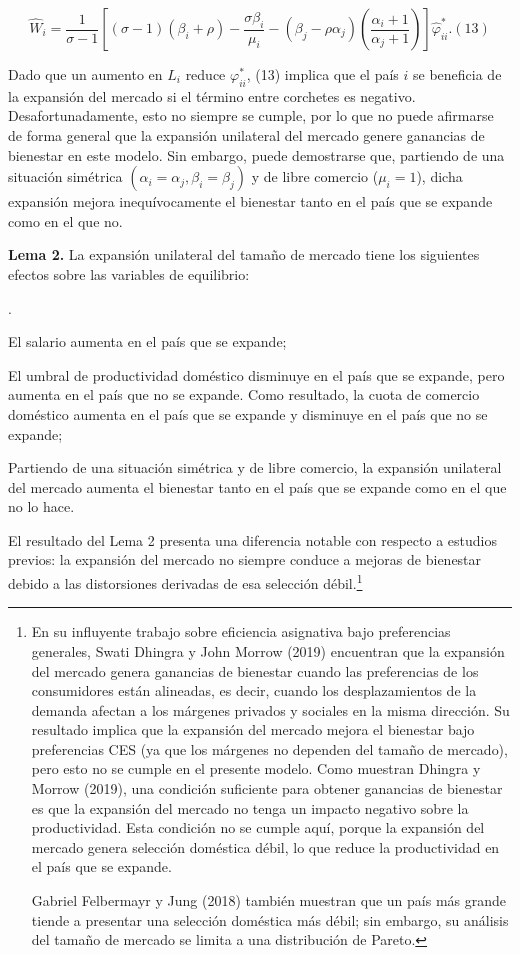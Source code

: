 \documentclass[10pt,a4paper]{article}
\newcounter{numitem}
\newenvironment{lnum}
      {\begin{list}{\arabic{numitem}.}{%
          \usecounter{numitem}%
          \setlength{\leftmargin}{1cm}%
          \setlength{\parskip}{3pt}%
          \setlength{\itemsep}{0pt}%
          \setlength{\parsep}{0pt}%
      }}
      {\end{list}}
\begin{document}
$$\hat{W}_i =\frac{1}{\sigma - 1}\left[(\sigma - 1)(\beta_i + \rho) -\frac{\sigma\beta_i}{\mu_i}-(\beta_j-\rho\alpha_j)\left(\frac{\alpha_i+1}{\alpha_j+1}\right)\right]\hat{\varphi}_{ii}^*.(13)$$

Dado que un aumento en $L_i$ reduce $\varphi_{ii}^*$, (13) implica que el país $i$ se beneficia de la expansión del mercado si el término entre corchetes es negativo. Desafortunadamente, esto no siempre se cumple, por lo que no puede afirmarse de forma general que la expansión unilateral del mercado genere ganancias de bienestar en este modelo. Sin embargo, puede demostrarse que, partiendo de una situación simétrica $(\alpha_i = \alpha_j, \beta_i = \beta_j)$ y de libre comercio ($\mu_i = 1$), dicha expansión mejora inequívocamente el bienestar tanto en el país que se expande como en el que no.

\textbf{Lema 2.} La expansión unilateral del tamaño de mercado tiene los siguientes efectos sobre las variables de equilibrio:
\begin{lnum}
    \item El salario aumenta en el país que se expande;
    \item El umbral de productividad doméstico disminuye en el país que se expande, pero aumenta en el país que no se expande. Como resultado, la cuota de comercio doméstico aumenta en el país que se expande y disminuye en el país que no se expande;
    \item Partiendo de una situación simétrica y de libre comercio, la expansión unilateral del mercado aumenta el bienestar tanto en el país que se expande como en el que no lo hace.
\end{lnum}

El resultado del Lema 2 presenta una diferencia notable con respecto a estudios previos: la expansión del mercado no siempre conduce a mejoras de bienestar debido a las distorsiones derivadas de esa selección débil.\footnote{%
    En su influyente trabajo sobre eficiencia asignativa bajo preferencias generales, Swati Dhingra y John Morrow (2019) encuentran que la expansión del mercado genera ganancias de bienestar cuando las preferencias de los consumidores están alineadas, es decir, cuando los desplazamientos de la demanda afectan a los márgenes privados y sociales en la misma dirección. Su resultado implica que la expansión del mercado mejora el bienestar bajo preferencias CES (ya que los márgenes no dependen del tamaño de mercado), pero esto no se cumple en el presente modelo. Como muestran Dhingra y Morrow (2019), una condición suficiente para obtener ganancias de bienestar es que la expansión del mercado no tenga un impacto negativo sobre la productividad. Esta condición no se cumple aquí, porque la expansión del mercado genera selección doméstica débil, lo que reduce la productividad en el país que se expande.

Gabriel Felbermayr y Jung (2018) también muestran que un país más grande tiende a presentar una selección doméstica más débil; sin embargo, su análisis del tamaño de mercado se limita a una distribución de Pareto.
}
\end{document}
